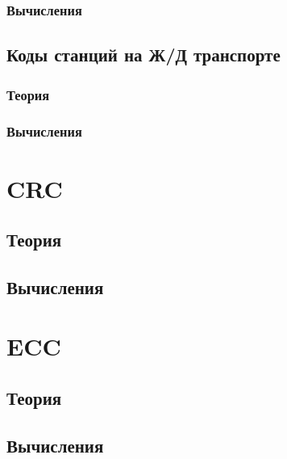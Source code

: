 \documentclass{article}
\begin{document}
\subsubsection{Вычисления}

\subsection{Коды станций на Ж/Д транспорте}
\subsubsection{Теория}
\subsubsection{Вычисления}

\section{CRC}
\subsection{Теория}
\subsection{Вычисления}

\section{ECC}
\subsection{Теория}
\subsection{Вычисления}
\end{document}
